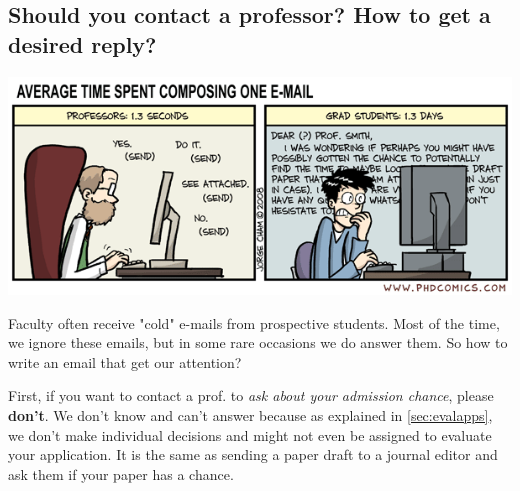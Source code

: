 \documentclass[oneside,11pt,dvipsnames]{book}
\begin{document}


\subsection{Should you contact a professor? How to get a desired reply?}\label{sec:contact}


\begin{center}
  \includegraphics[scale=0.6]{files/emails.png}
\end{center}


Faculty often receive "cold" e-mails from prospective students. Most of the time, we ignore these emails, but in some rare occasions we do answer them. So how to write an email that get our attention?



First, if you want to contact a prof. to \emph{ask about your admission chance}, please \textbf{don't}. We don't know and can't answer because as explained in \autoref{sec:evalapps}, we don't make individual decisions and might not even be assigned to evaluate your application.  It is the same as sending a paper draft to a journal editor and ask them if your paper has a chance.
\end{document}
